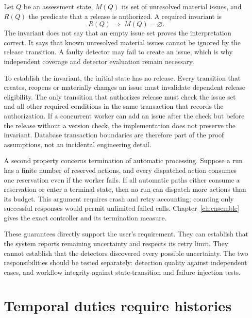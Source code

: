 Let $Q$ be an assessment state, $M(Q)$ its set of unresolved material issues,
and $R(Q)$ the predicate that a release is authorized. A required invariant is
\begin{equation}
 R(Q)\ \Longrightarrow\ M(Q)=\varnothing.
 \label{eq:no-open-release}
\end{equation}
The invariant does not say that an empty issue set proves the interpretation
correct. It says that known unresolved material issues cannot be ignored by
the release transition. A faulty detector may fail to create an issue, which
is why independent coverage and detector evaluation remain necessary.


To establish the invariant, the initial state has no release. Every transition
that creates, reopens or materially changes an issue must invalidate dependent
release eligibility. The only transition that authorizes release must check
the issue set and all other required conditions in the same transaction that
records the authorization. If a concurrent worker can add an issue after the
check but before the release without a version check, the implementation does
not preserve the invariant. Database transaction boundaries are therefore part
of the proof assumptions, not an incidental engineering detail.

A second property concerns termination of automatic processing. Suppose a run
has a finite number of reserved actions, and every dispatched action consumes
one reservation even if the worker fails. If all automatic paths either
consume a reservation or enter a terminal state, then no run can dispatch more
actions than its budget. This argument requires crash and retry accounting;
counting only successful responses would permit unlimited failed calls.
Chapter~\ref{ch:ensemble} gives the exact controller and its termination
measure.

These guarantees directly support the user's requirement. They can establish
that the system reports remaining uncertainty and respects its retry limit.
They cannot establish that the detectors discovered every possible uncertainty.
The two responsibilities should be tested separately: detection quality against
independent cases, and workflow integrity against state-transition and failure
injection tests.

\section{Temporal duties require histories}
\label{merge:M03:11}

